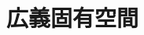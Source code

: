 \documentclass[../../topic_linear-algebra]{subfiles}
\begin{document}
\chapter{広義固有空間}\label{ch:generalized-eigenspace}
\end{document}
